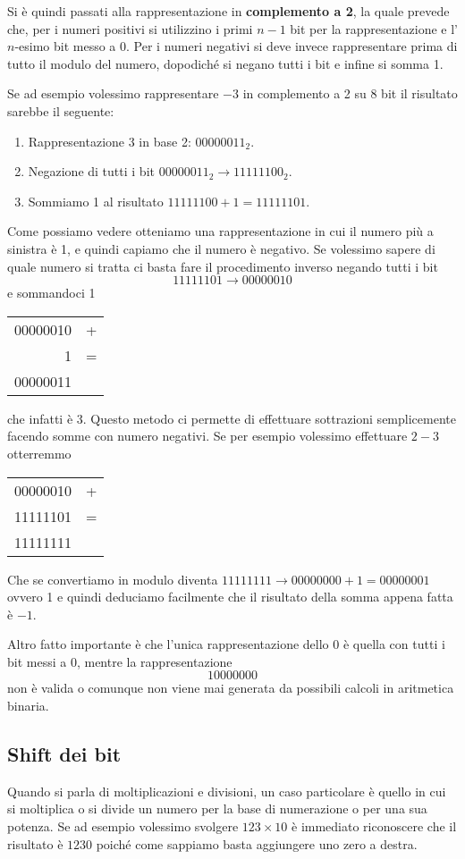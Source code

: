 Si è quindi passati alla rappresentazione in \textbf{complemento a 2}, la quale prevede che, per i
numeri positivi si utilizzino i primi $n-1$ bit per la rappresentazione e l'$n$-esimo bit messo a 0.
Per i numeri negativi si deve invece rappresentare prima di tutto il modulo del numero, dopodiché
si negano tutti i bit e infine si somma 1.

Se ad esempio volessimo rappresentare $-3$ in complemento a 2 su 8 bit il risultato sarebbe il
seguente:
\begin{enumerate}
	\item Rappresentazione 3 in base 2: $00000011_2$.
	\item Negazione di tutti i bit $00000011_2 \to 11111100_2$.
	\item Sommiamo 1 al risultato $11111100 + 1 = 11111101$.
\end{enumerate}
Come possiamo vedere otteniamo una rappresentazione in cui il numero più a sinistra è 1, e quindi
capiamo che il numero è negativo. Se volessimo sapere di quale numero si tratta ci basta fare il
procedimento inverso negando tutti i bit
\[ 11111101 \to 00000010 \]
e sommandoci 1
\begin{center}
	\begin{tabular}{r c}
		00000010 & + \\
		1        & = \\ \hline
		00000011
	\end{tabular}
\end{center}
che infatti è 3. Questo metodo ci permette di effettuare sottrazioni semplicemente facendo somme
con numero negativi. Se per esempio volessimo effettuare $2 - 3$ otterremmo
\begin{center}
	\begin{tabular}{r c}
		00000010 & + \\
		11111101 & = \\ \hline
		11111111
	\end{tabular}
\end{center}
Che se convertiamo in modulo diventa $11111111 \to 00000000 + 1 = 00000001$ ovvero 1 e quindi
deduciamo facilmente che il risultato della somma appena fatta è $-1$.

Altro fatto importante è che l'unica rappresentazione dello 0 è quella con tutti i bit messi a 0,
mentre la rappresentazione
\[ 10000000 \]
non è valida o comunque non viene mai generata da possibili calcoli in aritmetica binaria.

\subsection{Shift dei bit}
Quando si parla di moltiplicazioni e divisioni, un caso particolare è quello in cui si moltiplica
o si divide un numero per la base di numerazione o per una sua potenza. Se ad esempio volessimo
svolgere $123 \times 10$ è immediato riconoscere che il risultato è $1230$ poiché come sappiamo
basta aggiungere uno zero a destra.

